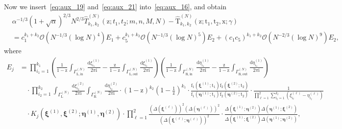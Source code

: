 \documentclass{article}
\numberwithin{equation}{section}
\newcommand{\bigO}{\mathcal{O}}
\newcommand{\ddbar}[2]{\frac{{\mathrm d}#1}{2\pi {\mathrm i}#2}}
\newcommand{\inn}{\mathrm{in}}
\newcommand{\LL}{\mathrm{L}}
\newcommand{\out}{\mathrm{out}}
\newcommand{\RR}{\mathrm{R}}
\begin{document}
Now we insert~\eqref{eq:aux_19} and~\eqref{eq:aux_21} into~\eqref{eq:aux_16}, and obtain
\begin{equation}
	\label{eq:aux_22}
	\begin{split}
		&\alpha^{-1/3}(1+\sqrt{\alpha})^{2/3}N^{2/3}\hat T_{k_1,k_2}^{(N)}(\mathrm{z};t_1,t_2;m,n,M,N) - \mathrm{\hat T}_{k_1,k_2}^{(N)}(\mathrm{z};\mathrm{t}_1,\mathrm{t}_2,\mathrm{x};\gamma)\\
		&=c_1^{k_1+k_2}\bigO(N^{-1/3}(\log N)^4)E_1+c_5^{k_1+k_2}\bigO(N^{-1/3}(\log N)^5) E_2 + (c_1c_5)^{k_1+k_2}\bigO(N^{-2/3}(\log N)^9) E_2,
	\end{split}
\end{equation}
where
\begin{equation}
	\begin{split}
		E_j&=
		\prod_{i_1=1}^{k_1}     
		\left(  \frac{1}{1-\mathrm{z}} \int_{\Gamma^{(N)}_{\LL,\inn}} 	    
		\ddbar{\xi^{(1)}_{i_1}}{}   
		-\frac{\mathrm{z}}{1-\mathrm{z}} \int_{\Gamma^{(N)}_{\LL,\out}} \ddbar{\xi^{(1)}_{i_1}}{}
		\right)
		\left(  \frac{1}{1-\mathrm{z}}  \int_{\Gamma^{(N)}_{\RR,\inn}}  
		\ddbar{\eta^{(1)}_{i_1}}{}
		-\frac{\mathrm{z}}{1-\mathrm{z}}   \int_{\Gamma^{(N)}_{\RR,\out}}
		\ddbar{\eta^{(1)}_{i_1}}{}
		\right)
		\\
		&\quad \cdot 
		\prod_{i_2=1}^{k_2}  
		\int_{\Gamma^{(N)}_\LL} \ddbar{\xi^{(2)}_{i_2}}{} 
		\int_{\Gamma^{(N)}_\RR} \ddbar{\eta^{(2)}_{i_2}}{} 
		\cdot    
		\left(1-\mathrm{z}\right)^{k_2}
		\left(1-\frac{1}{\mathrm{z}}\right)^{k_1}
		\cdot \frac
		{\mathrm f_1(\boldsymbol{\xi}^{(1)};\mathrm{t}_1)
			\mathrm f_2(\boldsymbol{\xi}^{(2)};\mathrm{t}_2)}
		{\mathrm f_1(\boldsymbol{\eta}^{(1)};\mathrm{t}_1)
			\mathrm f_2(\boldsymbol{\eta}^{(2)};\mathrm{t}_2)}\cdot 
		\frac{1}{\prod_{\ell=1}^2\sum_{i_\ell=1}^{k_\ell}(\xi_{i_\ell}^{(\ell)} -\eta_{i_\ell}^{(\ell)})}
		\\
		&\quad \cdot
		K_j(\boldsymbol{\xi}^{(1)},\boldsymbol{\xi}^{(2)};
		\boldsymbol{\eta}^{(1)},\boldsymbol{\eta}^{(2)}) \cdot 
		\prod_{\ell=1}^2
		\frac{\left( \Delta(\boldsymbol{\xi}^{(\ell)}) \right)^2
			\left( \Delta(\boldsymbol{\eta}^{(\ell)}) \right)^2
		}
		{\left( \Delta(\boldsymbol{\xi}^{(\ell)}; \boldsymbol{\eta}^{(\ell)}) \right)^2}
		\cdot 
		\frac{\Delta(\boldsymbol{\xi}^{(1)};\boldsymbol{\eta}^{(2)})
			\Delta(\boldsymbol{\eta}^{(1)};\boldsymbol{\xi}^{(2)})
		}
		{\Delta(\boldsymbol{\xi}^{(1)};\boldsymbol{\xi}^{(2)})
			\Delta(\boldsymbol{\eta}^{(1)};\boldsymbol{\eta}^{(2)})
		},
	\end{split}
\end{equation}
\end{document}
